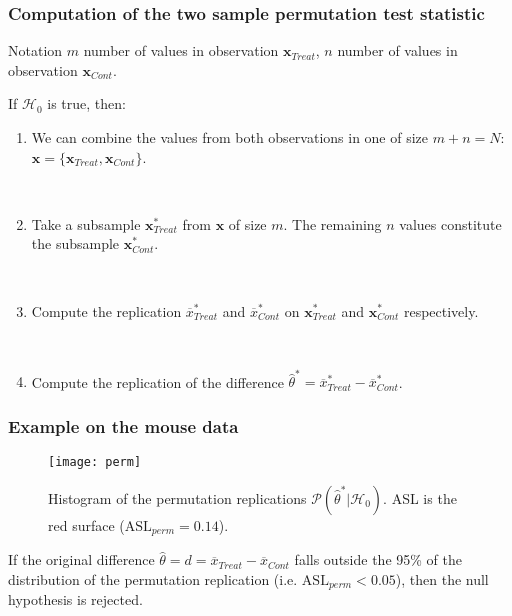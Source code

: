 \frame
{
\frametitle{Computation of the two sample permutation test statistic}

\begin{block}{}
Notation $m$ number of values in  observation $\mathbf{x}_{Treat}$, $n$ number of values in observation $\mathbf{x}_{Cont}$. 

\alert{If $\mathcal{H}_0$ is true, then:} 
\begin{enumerate}
\item We can combine the values from both observations in one of size $m+n=N$:  $\mathbf{x}=\lbrace \mathbf{x}_{Treat}, \mathbf{x}_{Cont}\rbrace$.

\

\item Take a subsample $\mathbf{x}_{Treat}^{*}$ from $\mathbf{x}$ of size $m$. The remaining $n$ values constitute the subsample $\mathbf{x}_{Cont}^{*}$.

\

\item Compute the replication $\overline{x}^{*}_{Treat}$ and $\overline{x}^{*}_{Cont}$ on $\mathbf{x}_{Treat}^{*}$ and $\mathbf{x}_{Cont}^{*}$ respectively.

\

\item Compute the replication of the difference $\hat{\theta}^{*}=\overline{x}^{*}_{Treat}-\overline{x}^{*}_{Cont}$.
\end{enumerate}
\end{block}
}
\frame
{
\frametitle{Example on the mouse data}

\begin{figure}[!h]
\texttt{[image: perm]}
\caption{Histogram of the permutation replications $\mathcal{P}(\hat{\theta}^{*}|\mathcal{H}_{0})$. ASL is the red surface ($\mathrm{ASL}_{perm}=0.14$).}
\end{figure}

\begin{block}{}
\small{If the original difference $\hat{\theta}=d=\overline{x}_{Treat}-\overline{x}_{Cont}$ falls outside the 95\% of the distribution of the permutation replication  (i.e. $\mathrm{ASL}_{perm}<0.05$), then the null hypothesis is rejected.}  
\end{block}
}
\frame
